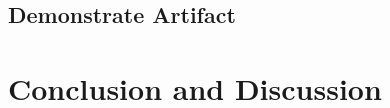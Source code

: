 \documentclass[12pt,
               a4,
               twoside,
               openright]{book} %
\begin{document}
    \section{Demonstrate Artifact}
    \label{sec:demo}
    
    \chapter{Conclusion and Discussion}
    
    
    

    \backmatter


%    
%    

%    
%    


    
    

\end{document}
